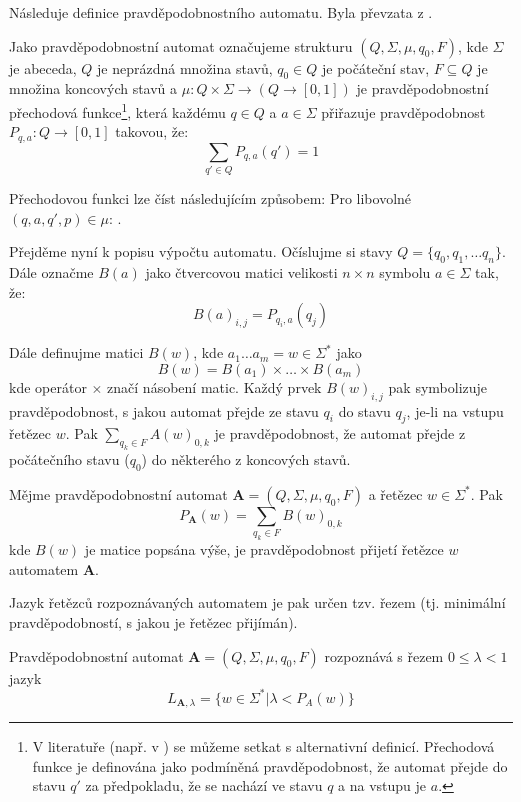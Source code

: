 Následuje definice pravděpodobnostního automatu. Byla převzata z \cite{Rab-ProbAut}.
\begin{definition}
 Jako pravděpodobnostní automat označujeme strukturu $(Q, \Sigma, \mu, q_0, F)$, kde $\Sigma$ je abeceda, $Q$ je neprázdná množina stavů, $q_0 \in Q$ je počáteční stav, $F \subseteq Q$ je množina koncových stavů a $\mu: Q \times \Sigma \rightarrow (Q \rightarrow [0,1])$ je pravděpodobnostní přechodová funkce\footnote{V literatuře (např. v \cite{San-ReaFuzLanProMaxMaxAut}) se můžeme setkat s alternativní definicí. Přechodová funkce je definována jako podmíněná pravděpodobnost, že automat přejde do stavu $q'$ za předpokladu, že se nachází ve stavu $q$ a na vstupu je $a$.}, která každému $q \in Q$ a $a \in \Sigma$ přiřazuje pravděpodobnost $P_{q,a}: Q \rightarrow [0,1]$ takovou, že:
 $$   
  \sum_{q' \in Q} P_{q, a}(q') = 1 
 $$
\end{definition}

Přechodovou funkci lze číst následujícím způsobem: Pro libovolné $(q, a, q', p) \in \mu$: .

Přejděme nyní k popisu výpočtu automatu. Očíslujme si stavy $Q = \{ q_0, q_1, \dots q_n \}$. Dále označme $B(a)$ jako čtvercovou matici velikosti $n \times n$ symbolu $a \in \Sigma$ tak, že:
$$
  B(a)_{i, j} = P_{q_i, a}(q_j)
$$

Dále definujme matici $B(w)$, kde $a_1 \dots a_m = w \in \Sigma^*$ jako
$$
  B(w) = B(a_1) \times \dots \times B(a_m)
$$
kde operátor $\times$ značí násobení matic. Každý prvek $B(w)_{i,j}$ pak symbolizuje pravděpodobnost, s jakou automat přejde ze stavu $q_i$ do stavu $q_j$, je-li na vstupu řetězec $w$. Pak $\sum_{q_k \in F} A(w)_{0, k}$ je pravděpodobnost, že automat přejde z počátečního stavu ($q_0$) do některého z koncových stavů.

\begin{definition}
 Mějme pravděpodobnostní automat $\mathbf{A} = (Q, \Sigma, \mu, q_0, F)$ a řetězec $w \in \Sigma^*$. Pak 
 $$
  P_\mathbf{A}(w) = \sum_{q_k \in F} B(w)_{0, k}
 $$ 
 kde $B(w)$ je matice popsána výše, je pravděpodobnost přijetí řetězce $w$ automatem $\mathbf{A}$.
\end{definition}

Jazyk řetězců rozpoznávaných automatem je pak určen tzv. řezem (tj. minimální pravděpodobností, s jakou je řetězec přijímán).
\begin{definition}
 Pravděpodobnostní automat $\mathbf{A} = (Q, \Sigma, \mu, q_0, F)$ rozpoznává s řezem $0 \leq \lambda < 1$ jazyk
 $$
  L_{\mathbf{A},\lambda} = \{ w \in \Sigma^* | \lambda < P_A(w) \}
 $$
\end{definition}

